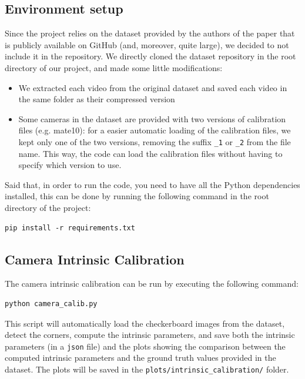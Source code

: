 \documentclass[11pt]{article}
\begin{document}
\subsection{Environment setup}

Since the project relies on the dataset provided by the authors of the paper that is publicly available on GitHub (and, moreover, quite large), we decided to not include it in the repository. We directly cloned the dataset repository in the root directory of our project, and made some little modifications:

\begin{itemize}
    \item We extracted each video from the original dataset and saved each video in the same folder as their compressed version
    \item Some cameras in the dataset are provided with two versions of calibration files (e.g. mate10): for a easier automatic loading of the calibration files, we kept only one of the two versions, removing the suffix \texttt{\_1} or \texttt{\_2} from the file name. This way, the code can load the calibration files without having to specify which version to use.
\end{itemize}

Said that, in order to run the code, you need to have all the Python dependencies installed, this can be done by running the following command in the root directory of the project:

\begin{verbatim}
pip install -r requirements.txt
\end{verbatim}

\subsection{Camera Intrinsic Calibration}

The camera intrinsic calibration can be run by executing the following command:

\begin{verbatim}
python camera_calib.py
\end{verbatim}

This script will automatically load the checkerboard images from the dataset, detect the corners, compute the intrinsic parameters, and save both the intrinsic parameters (in a \texttt{json} file) and the plots showing the comparison between the computed intrinsic parameters and the ground truth values provided in the dataset. The plots will be saved in the \texttt{plots/intrinsic\_calibration/} folder.
\end{document}

